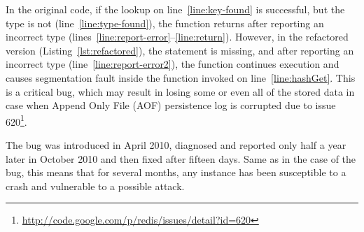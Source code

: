 In the original code, if the lookup on line~\ref{line:key-found} is successful,
but the type is not  (line~\ref{line:type-found}), the
function returns after reporting an incorrect type
(lines~\ref{line:report-error}--\ref{line:return}). However, in the refactored
version (Listing~\ref{lst:refactored}), the  statement is
missing, and after reporting an incorrect type (line~\ref{line:report-error2}),
the function continues execution and causes segmentation fault inside the
 function invoked on line~\ref{line:hashGet}. This is a
critical bug, which may result in losing some or even all of the stored data
in case when Append Only File (AOF) persistence log is corrupted due to issue
620\footnote{\url{http://code.google.com/p/redis/issues/detail?id=620}}.

The bug was introduced in April 2010, diagnosed and reported only
half a year later in October 2010 and then fixed after fifteen days.
Same as in the case of the \lighttpd bug, this means that for several months,
any \redis instance has been susceptible to a crash and vulnerable to a
possible attack.
